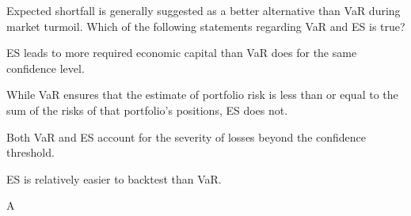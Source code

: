 \documentclass{article}
\newcounter{question} %
\begin{document}
\begin{question}
    Expected shortfall is generally suggested as a better alternative than VaR during market turmoil. Which of the following statements regarding VaR and ES is true?
\end{question}

\begin{choices}
    \item ES leads to more required economic capital than VaR does for the same confidence level.
    \item While VaR ensures that the estimate of portfolio risk is less than or equal to the sum of the risks of that portfolio's positions, ES does not.
    \item Both VaR and ES account for the severity of losses beyond the confidence threshold.
    \item ES is relatively easier to backtest than VaR.
\end{choices}

\begin{correctanswer}
    A
\end{correctanswer}
\end{document}
